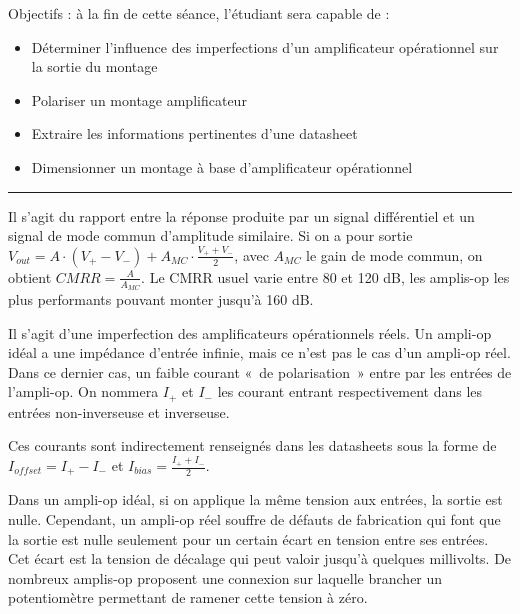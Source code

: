 \documentclass{../template/tp}
\author{The Fantastic Four}
\begin{document}

\vspace{-1cm}
Objectifs : à la fin de cette séance, l'étudiant sera capable de :
\begin{itemize}
\item Déterminer l'influence des imperfections d'un amplificateur opérationnel sur la sortie du montage
\item Polariser un montage amplificateur
\item Extraire les informations pertinentes d'une datasheet
\item Dimensionner un montage à base d'amplificateur opérationnel
\end{itemize}
\rule{\linewidth}{.5pt}


{
	Il s'agit du rapport entre la réponse produite par un signal différentiel et un signal de mode commun d'amplitude similaire.
	Si on a pour sortie $V_{out} = A\cdot (V_+ - V_-) + A_{MC} \cdot \frac{V_+ + V_-}{2}$, avec $A_{MC}$ le gain de mode commun, on obtient $CMRR = \frac{A}{A_{MC}}$.
	Le \textsc{CMRR} usuel varie entre 80 et 120 dB, les amplis-op les plus performants pouvant monter jusqu'à 160 dB.
}

{
	Il s'agit d'une imperfection des amplificateurs opérationnels réels.
	Un ampli-op idéal a une impédance d'entrée infinie, mais ce n'est pas le cas d'un ampli-op réel.
	Dans ce dernier cas, un faible courant «~de polarisation~» entre par les entrées de l'ampli-op.
	On nommera $I_+$ et $I_-$ les courant entrant respectivement dans les entrées non-inverseuse et inverseuse.

	Ces courants sont indirectement renseignés dans les datasheets sous la forme de $I_{offset} = I_+ - I_-$ et $I_{bias} = \frac{I_+ + I_-}{2}$.
}

{
	Dans un ampli-op idéal, si on applique la même tension aux entrées, la sortie est nulle.
	Cependant, un ampli-op réel souffre de défauts de fabrication qui font que la sortie est nulle seulement pour un certain écart en tension entre ses entrées.
	Cet écart est la tension de décalage qui peut valoir jusqu'à quelques millivolts.
	De nombreux amplis-op proposent une connexion sur laquelle brancher un potentiomètre permettant de ramener cette tension à zéro.
}
\end{document}
